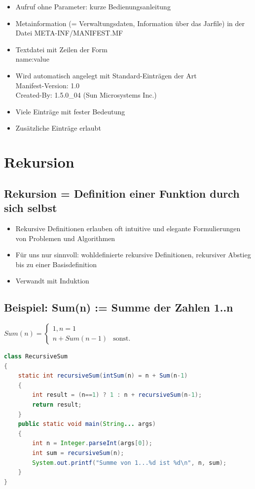 \begin{itemize}
\item Aufruf ohne Parameter: kurze Bedienungsanleitung
\item Metainformation (= Verwaltungsdaten, Information über das Jarfile) in der Datei META-INF/MANIFEST.MF
\item Textdatei mit Zeilen der Form \\
name:value
\item Wird automatisch angelegt mit Standard-Einträgen der Art\\
Manifest-Version: 1.0\\
Created-By: 1.5.0\_04 (Sun Microsystems Inc.)
\item Viele Einträge mit fester Bedeutung
\item Zusätzliche Einträge erlaubt
\end{itemize}
%
%
%
\section{Rekursion}
\subsection{Rekursion = Definition einer Funktion durch sich selbst}
\begin{itemize}
\item  Rekursive Definitionen erlauben oft intuitive und elegante Formulierungen von Problemen und Algorithmen
\item Für uns nur sinnvoll: wohldefinierte rekursive Definitionen, rekursiver Abstieg bis zu einer Basisdefinition
\item Verwandt mit Induktion
\end{itemize}
\subsection{Beispiel: Sum(n) := Summe der Zahlen 1..n}
$Sum(n) = \left\{ \begin{array}{ll}
         1,n =1 &\\
         n+Sum(n-1) & \textrm{sonst}.\end{array} \right. 
$\\
\begin{lstlisting}[language=JAVA]
class RecursiveSum
{
	static int recursiveSum(intSum(n) = n + Sum(n-1)
	{
		int result = (n==1) ? 1 : n + recursiveSum(n-1);
		return result;
	}
	public static void main(String... args)
	{
		int n = Integer.parseInt(args[0]);
		int sum = recursiveSum(n);
		System.out.printf("Summe von 1...%d ist %d\n", n, sum);
	}
}
\end{lstlisting}

